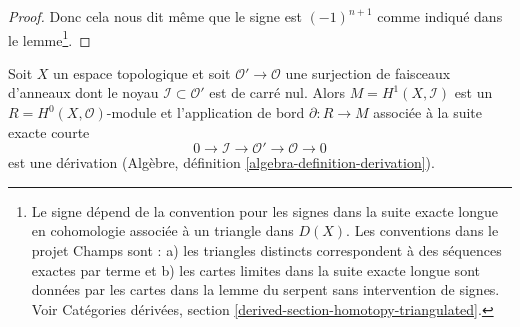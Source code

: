 \begin{proof}
Donc cela nous dit même que le signe est $(-1)^{n + 1}$ comme indiqué dans le lemme\footnote{Le signe dépend de la convention pour les signes dans la suite exacte longue en cohomologie associée à un triangle dans $D(X)$. Les conventions dans le projet Champs sont : a) les triangles distincts correspondent à des séquences exactes par terme et b) les cartes limites dans la suite exacte longue sont données par les cartes dans la lemme du serpent sans intervention de signes. Voir Catégories dérivées, section \ref{derived-section-homotopy-triangulated}.}.

\end{proof}

\begin{lemma}

\label{lemma-boundary-derivation-over-cup-product}

Soit $X$ un espace topologique et soit $\mathcal{O}' \to \mathcal{O}$ une surjection de faisceaux d'anneaux dont le noyau $\mathcal{I} \subset \mathcal{O}'$
est de carré nul. Alors $M = H^1(X, \mathcal{I})$ est un
$R = H^0(X, \mathcal{O})$-module et l'application de bord
$\partial : R \to M$ associée à la suite exacte courte
$$
0 \to \mathcal{I} \to \mathcal{O}' \to \mathcal{O} \to 0
$$
est une dérivation (Algèbre, définition \ref{algebra-definition-derivation}).

\end{lemma}


